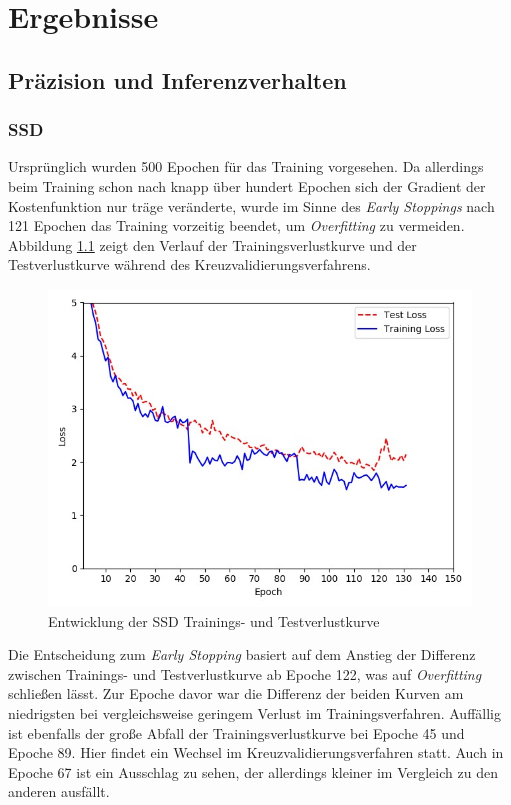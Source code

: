 \chapter{Ergebnisse}

\section{Präzision und Inferenzverhalten}

\subsection*{SSD}

Ursprünglich wurden 500 Epochen für das Training vorgesehen. Da allerdings beim Training schon nach knapp über hundert Epochen sich der Gradient der Kostenfunktion nur träge veränderte, wurde im Sinne des \textit{Early Stoppings} nach 121 Epochen das Training vorzeitig beendet, um \textit{Overfitting} zu vermeiden. Abbildung \ref{ssdloss} zeigt den Verlauf der Trainingsverlustkurve und der Testverlustkurve während des Kreuzvalidierungsverfahrens.

\begin{figure}[H]
	\begin{center}
		\includegraphics[width=13cm]{Bilder/ssdloss.jpeg} 
		\caption{Entwicklung der SSD Trainings- und Testverlustkurve}
		\label{ssdloss}
	\end{center}
\end{figure}

Die Entscheidung zum \textit{Early Stopping} basiert auf dem Anstieg der Differenz zwischen Trainings- und Testverlustkurve ab Epoche 122, was auf \textit{Overfitting} schließen lässt. Zur Epoche davor war die Differenz der beiden Kurven am niedrigsten bei vergleichsweise geringem Verlust im Trainingsverfahren. Auffällig ist ebenfalls der große Abfall der Trainingsverlustkurve bei Epoche 45 und Epoche 89. Hier findet ein Wechsel im Kreuzvalidierungsverfahren statt. Auch in Epoche 67 ist ein Ausschlag zu sehen, der allerdings kleiner im Vergleich zu den anderen ausfällt. 

